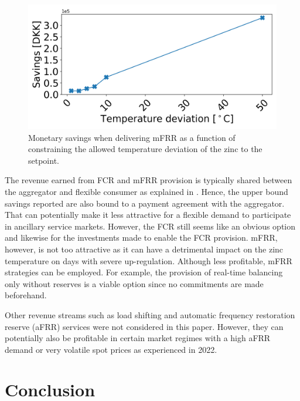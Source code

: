 \documentclass[sigconf]{acmart}
\begin{document}
\begin{figure}[t]
    \centering
    \includegraphics[width=\columnwidth]{figures/profit_vs_delta_temp_mfrr_and_energy.png}
    \caption{Monetary savings when delivering mFRR as a function of constraining the allowed temperature deviation of the zinc to the setpoint.}
    \label{fig:profit_vs_delta_temp_mfrr}
\end{figure}


The revenue earned from FCR and mFRR provision is typically shared between the aggregator and flexible consumer as explained in \cite{gade2022ecosystem}. Hence, the upper bound savings reported are also bound to a payment agreement with the aggregator. That can potentially make it less attractive for a flexible demand to participate in ancillary service markets. However, the FCR still seems like an obvious option and likewise for the investments made to enable the FCR provision. mFRR, however, is not too attractive as it can have a detrimental impact on the zinc temperature on days with severe up-regulation. Although less profitable, mFRR strategies can be employed. For example, the provision of real-time balancing only without reserves is a viable option since no commitments are made beforehand.

Other revenue streams such as load shifting and automatic frequency restoration reserve (aFRR) services were not considered in this paper. However, they can potentially also be profitable in certain market regimes with a high aFRR demand or very volatile spot prices as experienced in 2022.

\section{Conclusion}
\end{document}

